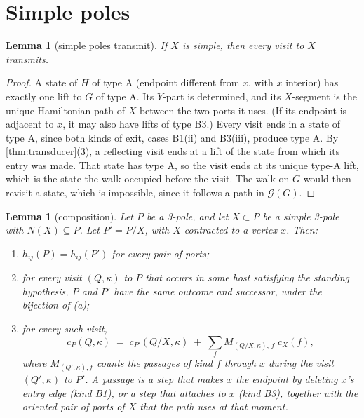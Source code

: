 \documentclass[11pt]{article}
\newtheorem{lemma}[theorem]{Lemma}
\theoremstyle{definition}
\newcommand{\cG}{\mathcal{G}}
\begin{document}
\section{Simple poles}\label{sec:simple}

\begin{lemma}[simple poles transmit]\label{lem:simple}
If $X$ is simple, then every visit to $X$ transmits.
\end{lemma}

\begin{proof}
A state of $H$ of type A (endpoint different from $x$, with $x$ interior) has exactly one lift to
$G$ of type A. Its $Y$-part is determined, and its $X$-segment is the unique Hamiltonian path of
$X$ between the two ports it uses. (If its endpoint is adjacent to $x$, it may also have lifts of
type B3.) Every visit ends in a state of type A, since both kinds of exit, cases B1(ii) and
B3(iii), produce type A. By \cref{thm:transducer}(3), a reflecting visit ends at a lift of the
state from which its entry was made. That state has type A, so the visit ends at its unique
type-A lift, which is the state the walk occupied before the visit. The walk on $G$ would then revisit a state, which is impossible, since it follows
a path in $\cG(G)$.
\end{proof}

\begin{lemma}[composition]\label{lem:composition}
Let $P$ be a 3-pole, and let $X \subset P$ be a simple 3-pole with $N(X) \subseteq P$. Let
$P' = P/X$, with $X$ contracted to a vertex $x$. Then:
\begin{enumerate}
\item[(a)] $h_{ij}(P) = h_{ij}(P')$ for every pair of ports;
\item[(b)] for every visit $(Q, \kappa)$ to $P$ that occurs in some host satisfying the standing
hypothesis, $P$ and $P'$ have the same outcome and successor, under the bijection of (a);
\item[(c)] for every such visit,
\[
c_P(Q,\kappa) \;=\; c_{P'}(Q/X,\kappa) \;+\; \sum_f M_{(Q/X,\kappa),\,f}\; c_X(f),
\]
where $M_{(Q',\kappa), f}$ counts the \emph{passages} of kind $f$ through $x$ during the visit
$(Q',\kappa)$ to $P'$. A passage is a step that makes $x$ the endpoint by deleting $x$'s entry
edge (kind B1), or a step that attaches to $x$ (kind B3), together with the oriented pair of ports
of $X$ that the path uses at that moment.
\end{enumerate}
\end{lemma}
\end{document}
